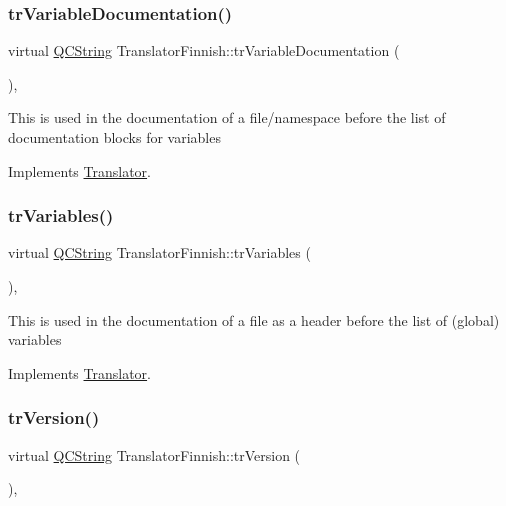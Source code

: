 \subsubsection{\texorpdfstring{trVariableDocumentation()}{trVariableDocumentation()}}
{\footnotesize\ttfamily virtual \mbox{\hyperlink{class_q_c_string}{Q\+C\+String}} Translator\+Finnish\+::tr\+Variable\+Documentation (\begin{DoxyParamCaption}{ }\end{DoxyParamCaption})\hspace{0.3cm}{\ttfamily [inline]}, {\ttfamily [virtual]}}

This is used in the documentation of a file/namespace before the list of documentation blocks for variables 

Implements \mbox{\hyperlink{class_translator}{Translator}}.

\mbox{\label{class_translator_finnish_a039a29995a971866c2a04b14561d8e9c}} 
\subsubsection{\texorpdfstring{trVariables()}{trVariables()}}
{\footnotesize\ttfamily virtual \mbox{\hyperlink{class_q_c_string}{Q\+C\+String}} Translator\+Finnish\+::tr\+Variables (\begin{DoxyParamCaption}{ }\end{DoxyParamCaption})\hspace{0.3cm}{\ttfamily [inline]}, {\ttfamily [virtual]}}

This is used in the documentation of a file as a header before the list of (global) variables 

Implements \mbox{\hyperlink{class_translator}{Translator}}.

\mbox{\label{class_translator_finnish_a063f9c4b072851c339196ea71de6cc52}} 
\subsubsection{\texorpdfstring{trVersion()}{trVersion()}}
{\footnotesize\ttfamily virtual \mbox{\hyperlink{class_q_c_string}{Q\+C\+String}} Translator\+Finnish\+::tr\+Version (\begin{DoxyParamCaption}{ }\end{DoxyParamCaption})\hspace{0.3cm}{\ttfamily [inline]}, {\ttfamily [virtual]}}

